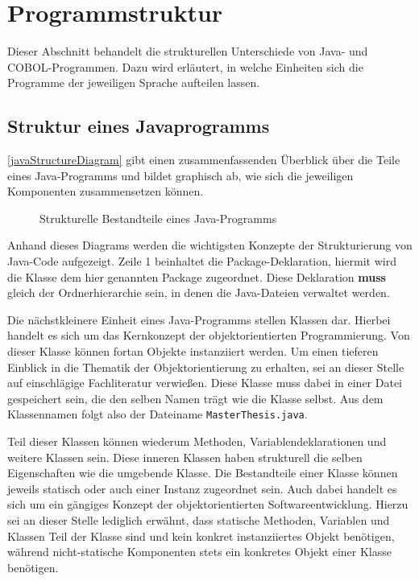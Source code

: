 \section{Programmstruktur}\label{sec:structure}
Dieser Abschnitt behandelt die strukturellen Unterschiede von Java- und COBOL-Programmen. Dazu wird erläutert, in welche Einheiten sich die Programme der jeweiligen Sprache aufteilen lassen. 

\subsection*{Struktur eines Javaprogramms}
\autoref{javaStructureDiagram} gibt einen zusammenfassenden Überblick über die Teile eines Java-Programms und bildet graphisch ab, wie sich die jeweiligen Komponenten zusammensetzen können.

\begin{figure}[H]
    \centering
    \resizebox{.9\linewidth}{!}{\unskip}
    \caption{Strukturelle Bestandteile eines Java-Programms \label{javaStructureDiagram}}
\end{figure}

Anhand dieses Diagrams werden die wichtigsten Konzepte der Strukturierung von Java-Code aufgezeigt. Zeile 1 beinhaltet die Package-Deklaration, \dh hiermit wird die Klasse dem hier genannten Package zugeordnet. Diese Deklaration \textbf{muss} gleich der Ordnerhierarchie sein, in denen die Java-Dateien verwaltet werden. 

Die nächstkleinere Einheit eines Java-Programms stellen Klassen dar. Hierbei handelt es sich um das Kernkonzept der objektorientierten Programmierung. Von dieser Klasse können fortan Objekte instanziiert werden. Um einen tieferen Einblick in die Thematik der Objektorientierung zu erhalten, sei an dieser Stelle auf einschlägige Fachliteratur verwießen. Diese Klasse muss dabei in einer Datei gespeichert sein, die den selben Namen trägt wie die Klasse selbst. Aus dem Klassennamen  folgt also der Dateiname \texttt{MasterThesis.java}.

Teil dieser Klassen können wiederum Methoden, Variablendeklarationen und weitere Klassen sein. Diese inneren Klassen haben strukturell die selben Eigenschaften wie die umgebende Klasse. Die Bestandteile einer Klasse können jeweils statisch oder auch einer Instanz zugeordnet sein. Auch dabei handelt es sich um ein gängiges Konzept der objektorientierten Softwareentwicklung. Hierzu sei an dieser Stelle lediglich erwähnt, dass statische Methoden, Variablen und Klassen Teil der Klasse sind und kein konkret instanziiertes Objekt benötigen, während nicht-statische Komponenten stets ein konkretes Objekt einer Klasse benötigen. 

